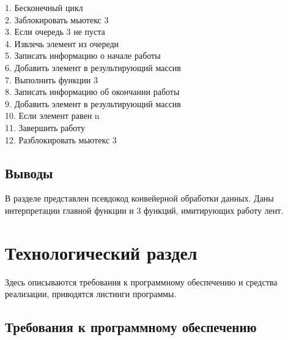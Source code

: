 \documentclass[a4paper,12pt]{article}
\begin{document}
\begin{flushleft}
	1. Бесконечный цикл\\
		2. \hspace{1.5cm} Заблокировать мьютекс 3\\
		3. \hspace{1.5cm} Если очередь 3 не пуста\\
		4. \hspace{3cm} Извлечь элемент из очереди\\
		5. \hspace{3cm} Записать информацию о начале работы\\
		6. \hspace{3cm} Добавить элемент в результирующий массив\\
		7. \hspace{3cm} Выполнить функции 3\\
		8. \hspace{3cm} Записать информацию об окончании работы\\
		9. \hspace{3cm} Добавить элемент в результирующий массив\\
		10. \hspace{3cm} Если элемент равен n\\
		11. \hspace{4.5cm} Завершить работу\\
		12. \hspace{1.5cm} Разблокировать мьютекс 3\\
\end{flushleft}

\subsection*{Выводы}

В разделе представлен псевдокод конвейерной обработки данных.
Даны интерпретации главной функции
и 3 функций, имитирующих работу лент.

\newpage

\section{Технологический раздел}

Здесь описываются требования к программному 
обеспечению и средства реализации, приводятся листинги 
программы.

\subsection{Требования к программному обеспечению}
\end{document}
